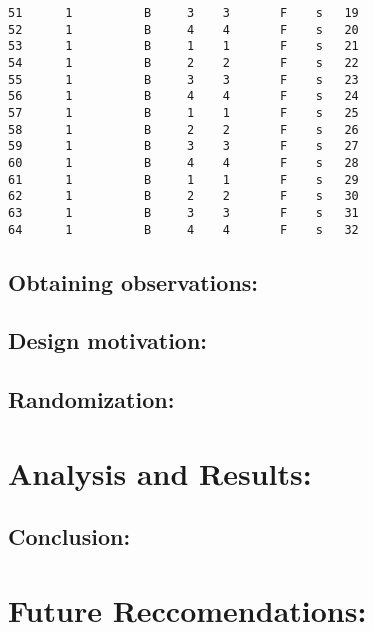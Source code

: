 \documentclass[
  11pt,
  letterpaper,
  DIV=11,
  numbers=noendperiod]{scrartcl}
\begin{document}
\begin{verbatim}
51      1          B     3    3       F    s   19
52      1          B     4    4       F    s   20
53      1          B     1    1       F    s   21
54      1          B     2    2       F    s   22
55      1          B     3    3       F    s   23
56      1          B     4    4       F    s   24
57      1          B     1    1       F    s   25
58      1          B     2    2       F    s   26
59      1          B     3    3       F    s   27
60      1          B     4    4       F    s   28
61      1          B     1    1       F    s   29
62      1          B     2    2       F    s   30
63      1          B     3    3       F    s   31
64      1          B     4    4       F    s   32
\end{verbatim}

\subsection{Obtaining observations:}\label{obtaining-observations}

\subsection{Design motivation:}\label{design-motivation}

\subsection{Randomization:}\label{randomization}

\section{Analysis and Results:}\label{analysis-and-results}

\subsection{Conclusion:}\label{conclusion}

\section{Future Reccomendations:}\label{future-reccomendations}
\end{document}
